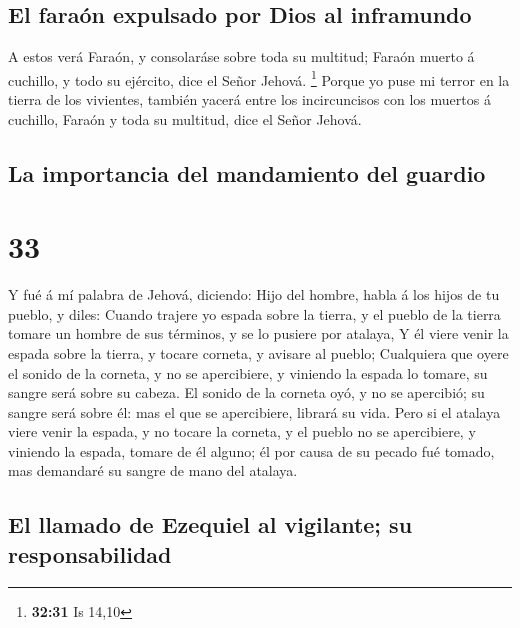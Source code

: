 \hypertarget{el-farauxf3n-expulsado-por-dios-al-inframundo}{%
\subsection{El faraón expulsado por Dios al
inframundo}\label{el-farauxf3n-expulsado-por-dios-al-inframundo}}

 A estos verá Faraón, y consolaráse sobre toda su
multitud; Faraón muerto á cuchillo, y todo su ejército, dice el Señor
Jehová. \footnote{\textbf{32:31} Is 14,10}  Porque yo
puse mi terror en la tierra de los vivientes, también yacerá entre los
incircuncisos con los muertos á cuchillo, Faraón y toda su multitud,
dice el Señor Jehová.

\hypertarget{la-importancia-del-mandamiento-del-guardio}{%
\subsection{La importancia del mandamiento del
guardio}\label{la-importancia-del-mandamiento-del-guardio}}

\hypertarget{section-32}{%
\section{33}\label{section-32}}

 Y fué á mí palabra de Jehová, diciendo: 
Hijo del hombre, habla á los hijos de tu pueblo, y diles: Cuando trajere
yo espada sobre la tierra, y el pueblo de la tierra tomare un hombre de
sus términos, y se lo pusiere por atalaya,  Y él viere
venir la espada sobre la tierra, y tocare corneta, y avisare al pueblo;
 Cualquiera que oyere el sonido de la corneta, y no se
apercibiere, y viniendo la espada lo tomare, su sangre será sobre su
cabeza.  El sonido de la corneta oyó, y no se apercibió;
su sangre será sobre él: mas el que se apercibiere, librará su vida.
 Pero si el atalaya viere venir la espada, y no tocare la
corneta, y el pueblo no se apercibiere, y viniendo la espada, tomare de
él alguno; él por causa de su pecado fué tomado, mas demandaré su sangre
de mano del atalaya.

\hypertarget{el-llamado-de-ezequiel-al-vigilante-su-responsabilidad}{%
\subsection{El llamado de Ezequiel al vigilante; su
responsabilidad}\label{el-llamado-de-ezequiel-al-vigilante-su-responsabilidad}}

